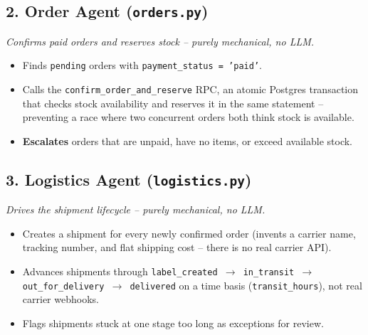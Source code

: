 \documentclass[11pt,a4paper]{article}
\newcommand{\agenthead}[2]{%
  \subsection*{\textcolor{accent}{#1}}%
  \textit{#2}\par\vspace{2pt}
}
\begin{document}
\agenthead{2. Order Agent (\texttt{orders.py})}{Confirms paid orders and reserves stock --
purely mechanical, no LLM.}
\begin{itemize}[itemsep=1pt]
\item Finds \texttt{pending} orders with \texttt{payment\_status = 'paid'}.
\item Calls the \texttt{confirm\_order\_and\_reserve} RPC, an atomic Postgres transaction that
checks stock availability and reserves it in the same statement -- preventing a race where two
concurrent orders both think stock is available.
\item \textbf{Escalates} orders that are unpaid, have no items, or exceed available stock.
\end{itemize}

\agenthead{3. Logistics Agent (\texttt{logistics.py})}{Drives the shipment lifecycle --
purely mechanical, no LLM.}
\begin{itemize}[itemsep=1pt]
\item Creates a shipment for every newly confirmed order (invents a carrier name, tracking
number, and flat shipping cost -- there is no real carrier API).
\item Advances shipments through \texttt{label\_created $\to$ in\_transit $\to$
out\_for\_delivery $\to$ delivered} on a time basis (\texttt{transit\_hours}), not real carrier
webhooks.
\item Flags shipments stuck at one stage too long as exceptions for review.
\end{itemize}
\end{document}
